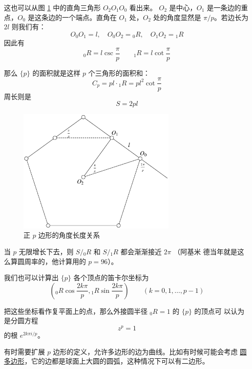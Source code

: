 \documentclass[cs4size,a4paper,adobefonts,openany]{ctexbook}
\newcommand{\pname}[1]{\underline{#1}}
\numberwithin{equation}{section}
\begin{document}
这也可以从图 \ref{fig:pentagon} 中的直角三角形 $O_2O_1O_0$ 看出来。
$O_2$ 是中心，$O_1$ 是一条边的重点，$O_0$ 是这条边的一个端点。直角在
$O_1$ 处，$O_2$ 处的角度显然是 $\pi/p$。若边长为 $2l$ 则我们有：
\[
O_0O_1=l,\quad O_0O_2={_0R}, \quad O_1O_2={_1R}
\]
因此有
\begin{equation}
  {_0R}=l\csc\frac{\pi}{p}\qquad {_1R}=l\cot\frac{\pi}{p}
\end{equation}

那么 $\{p\}$ 的面积就是这样 $p$ 个三角形的面积和：
\begin{equation}
  C_p = pl\cdot {_1R} = pl^2\cot\frac{\pi}{p}
\end{equation}
周长则是
\begin{equation}
  S=2pl
\end{equation}

\begin{figure}[htbp]
  \centering \includegraphics[width=0.7\textwidth]{images/pentagon}
  \caption{正 $p$ 边形的角度长度关系} \label{fig:pentagon}
\end{figure}

当 $p$ 无限增长下去，则 $S/{_0R}$ 和 $S/{_1R}$ 都会渐渐接近 $2\pi$ （阿基米
  德当年就是这么算圆周率的，他计算用的 $p=96$）。

我们也可以计算出 $\{p\}$ 各个顶点的笛卡尔坐标为
\[
\left({_0R}\cos\frac{2k\pi}{p},{_1R}\sin\frac{2k\pi}{p}\right)\qquad(k=0,1,\dots,p-1)
\]

把这些坐标看作复平面上的点，那么外接圆半径 ${_0R}=1$ 的 $\{p\}$ 的顶点可
以认为是分圆方程
\begin{equation}
  z^p=1
\end{equation}
的根 $e^{2k\pi i/p}$。

有时需要扩展 $p$ 边形的定义，允许多边形的边为曲线。比如有时候可能会考虑
\pname{圆多边形}，它的边都是球面上大圆的圆弧，这种情况下可以有二边形。
\end{document}
